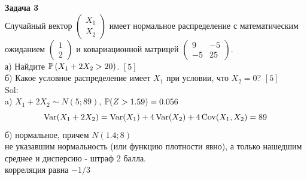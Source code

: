 \documentclass[12pt, a4paper]{article}\usepackage[]{graphicx}\usepackage[]{color}
\begin{document}
	\textbf{Задача 3} \\ %
	Случайный вектор  $\left(\begin{array}{c}
	{X_{1} } \\ {X_{2} }
	\end{array}\right)$  имеет нормальное распределение с
	математическим ожиданием  $\left(\begin{array}{c} {1} \\ {2}
	\end{array}\right)$  и ковариационной матрицей
	$\left(\begin{array}{cc} {9} & {-5} \\ {-5} & {25}
	\end{array}\right)$. \\
	а) Найдите  $\P\left(X_{1} +2X_{2} >20\right)$. $[5]$ \\
	б) Какое условное распределение имеет $X_{1}$ при условии, что $X_{2}=0$? $[5]$ \\
	Sol: \\
	a) $X_{1}+2X_{2}\sim N(5;89)$, $\P(Z>1.59)=0.056$
	\[
	\Var(X_1+2X_2)=\Var(X_1)+4\Var(X_2)+4\Cov(X_1,X_2)=89
	\]
	б) нормальное, причем $N(1.4;8)$ \\
	не указавшим нормальность (или функцию плотности явно), а только нашедшим среднее и дисперсию - штраф 2 балла. \\
	корреляция равна $-1/3$ \\




\end{document}
